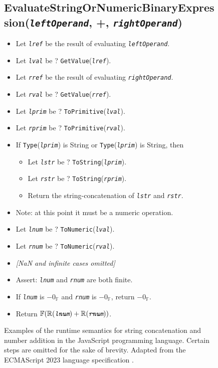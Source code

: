 \newcommand{\jvar}[1]{\textit{\texttt{#1}}}
\newcommand{\jop}[1]{\texttt{#1}}

\begin{figure}
  \subsection*{EvaluateStringOrNumericBinaryExpression(\jvar{leftOperand}, +, \jvar{rightOperand})}
  \begin{itemize}
    \item Let \jvar{lref} be the result of evaluating \jvar{leftOperand}.
    \item Let \jvar{lval} be ? \jop{GetValue}(\jvar{lref}).
    \item Let \jvar{rref} be the result of evaluating \jvar{rightOperand}.
    \item Let \jvar{rval} be ? \jop{GetValue}(\jvar{rref}).
    \item Let \jvar{lprim} be ? \jop{ToPrimitive}(\jvar{lval}).
    \item Let \jvar{rprim} be ? \jop{ToPrimitive}(\jvar{rval}).
    \item If \jop{Type}(\jvar{lprim}) is String or \jop{Type}(\jvar{lprim}) is String, then
    \begin{itemize}
      \item Let \jvar{lstr} be ? \jop{ToString}(\jvar{lprim}).
      \item Let \jvar{rstr} be ? \jop{ToString}(\jvar{rprim}).
      \item Return the string-concatenation of \jvar{lstr} and \jvar{rstr}.
    \end{itemize}
    \item Note: at this point it must be a numeric operation.
    \item Let \jvar{lnum} be ? \jop{ToNumeric}(\jvar{lval}).
    \item Let \jvar{rnum} be ? \jop{ToNumeric}(\jvar{rval}).
    \item \textit{[NaN and infinite cases omitted]}
    \item Assert: \jvar{lnum} and \jvar{rnum} are both finite.
    \item If \jvar{lnum} is $ - 0_{\mathbb{F}} $ and \jvar{rnum} is $ -0_{\mathbb{F}} $, return $ - 0_{\mathbb{F}} $.
    \item Return $ \mathbb{F}(\mathbb{R}(\jvar{lnum}) + \mathbb{R}(\jvar{rnum})) $.
  \end{itemize}
  \caption{Examples of the runtime semantics for string concatenation and number addition in the JavaScript programming language. Certain steps are omitted for the sake of brevity. Adapted from the ECMAScript 2023 language specification \cite{ecma1999262}.}
  \label{fig:javascript_semantics_example}
\end{figure}

